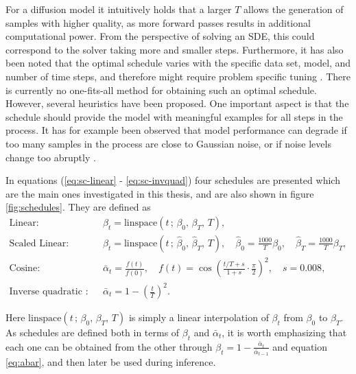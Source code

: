 \documentclass{report}
\begin{document}
For a diffusion model it intuitively holds that a larger $T$ allows the generation of samples with higher quality, as more forward passes results in additional computational power. From the perspective of solving an SDE, this could correspond to the solver taking more and smaller steps. Furthermore, it has also been noted that the optimal schedule varies with the specific data set, model, and number of time steps, and therefore might require problem specific tuning \cite{lam2022bddm, chen2020wavegrad}. There is currently no one-fits-all method for obtaining such an optimal schedule. However, several heuristics have been proposed. One important aspect is that the schedule should provide the model with meaningful examples for all steps in the process. It has for example been observed that model performance can degrade if too many samples in the process are close to Gaussian noise, or if noise levels change too abruptly \cite{nichol2021improved}. 

In equations (\ref{eq:sc-linear} - \ref{eq:sc-invquad}) four schedules are presented which are the main ones investigated in this thesis, and are also shown in figure \ref{fig:schedules}. They are defined as
\begin{align} 
    \text{Linear}: & \quad \beta_t = \text{linspace}(t \, ; \, \beta_0, \, \beta_T, \, T), \label{eq:sc-linear} \\
    \text{Scaled Linear}: & \quad \beta_t = \text{linspace}(t \, ; \, \hat{\beta}_0, \, \hat{\beta}_T, \, T), \quad \hat{\beta}_0 = \frac{1000}{T} \beta_0, \quad \hat{\beta}_T = \frac{1000}{T}\beta_T, \label{eq:sc-scaled} \\
    \text{Cosine}: & \quad \bar{\alpha}_t = \frac{f(t)}{f(0)}, \quad f(t) = \cos\left( \frac{t/T + s}{ 1+ s}\cdot \frac{\pi}{2} \right)^2, \quad s = 0.008, \label{eq:sc-cos} \\
    \text{Inverse quadratic (IQ)}: & \quad \bar{\alpha}_t = 1 - \left(\frac{t}{T}\right)^2. \label{eq:sc-invquad}
\end{align}

Here $\text{linspace}(t \, ; \, \beta_0, \, \beta_T, \, T)$ is simply a linear interpolation of $\beta_t$ from $\beta_0$ to $\beta_T$. As schedules are defined both in terms of $\beta_t$ and $\bar{\alpha}_t$, it is worth emphasizing that each one can be obtained from the other through $\beta_t = 1 - \frac{\bar{\alpha}_t}{\bar{\alpha}_{t-1}}$ and equation \ref{eq:abar}, and then later be used during inference.
\end{document}
